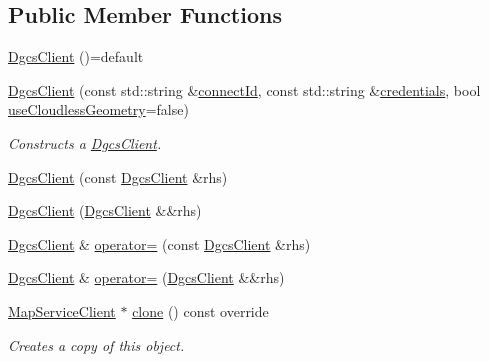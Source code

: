 \subsection*{Public Member Functions}
\begin{DoxyCompactItemize}
\item 
\hyperlink{structdg_1_1deepcore_1_1imagery_1_1_dgcs_client_a202ae9f66257a914da8b032212304b0e}{Dgcs\+Client} ()=default
\item 
\hyperlink{structdg_1_1deepcore_1_1imagery_1_1_dgcs_client_a0058760594e9e52b23a5b9cad79a06a3}{Dgcs\+Client} (const std\+::string \&\hyperlink{classdg_1_1deepcore_1_1imagery_1_1_dg_wmts_client_aaa23928355c68c5422a5aab297d64f99}{connect\+Id}, const std\+::string \&\hyperlink{group___imagery_module_gac4c03ea635c336ca2fe7de533706c11c}{credentials}, bool \hyperlink{classdg_1_1deepcore_1_1imagery_1_1_dg_wmts_client_a718ef987832eb1d5bbab510c6ef7b70c}{use\+Cloudless\+Geometry}=false)
\begin{DoxyCompactList}\small\item\em Constructs a \hyperlink{structdg_1_1deepcore_1_1imagery_1_1_dgcs_client}{Dgcs\+Client}. \end{DoxyCompactList}\item 
\hyperlink{structdg_1_1deepcore_1_1imagery_1_1_dgcs_client_a0b27a9e9336f398c206e77a5eb6d1774}{Dgcs\+Client} (const \hyperlink{structdg_1_1deepcore_1_1imagery_1_1_dgcs_client}{Dgcs\+Client} \&rhs)
\item 
\hyperlink{structdg_1_1deepcore_1_1imagery_1_1_dgcs_client_a59f421238913e2d53e5bb8a0346336c0}{Dgcs\+Client} (\hyperlink{structdg_1_1deepcore_1_1imagery_1_1_dgcs_client}{Dgcs\+Client} \&\&rhs)
\item 
\hyperlink{structdg_1_1deepcore_1_1imagery_1_1_dgcs_client}{Dgcs\+Client} \& \hyperlink{structdg_1_1deepcore_1_1imagery_1_1_dgcs_client_a9488ea6eeaba836f2d5d3c5dcbf8e39c}{operator=} (const \hyperlink{structdg_1_1deepcore_1_1imagery_1_1_dgcs_client}{Dgcs\+Client} \&rhs)
\item 
\hyperlink{structdg_1_1deepcore_1_1imagery_1_1_dgcs_client}{Dgcs\+Client} \& \hyperlink{structdg_1_1deepcore_1_1imagery_1_1_dgcs_client_a0a87b75b0c7084186d83703453c16ff0}{operator=} (\hyperlink{structdg_1_1deepcore_1_1imagery_1_1_dgcs_client}{Dgcs\+Client} \&\&rhs)
\item 
\hyperlink{classdg_1_1deepcore_1_1imagery_1_1_map_service_client}{Map\+Service\+Client} $\ast$ \hyperlink{structdg_1_1deepcore_1_1imagery_1_1_dgcs_client_ab90b1061bcc84a100ff3e760f1d288e2}{clone} () const override
\begin{DoxyCompactList}\small\item\em Creates a copy of this object. \end{DoxyCompactList}\end{DoxyCompactItemize}
